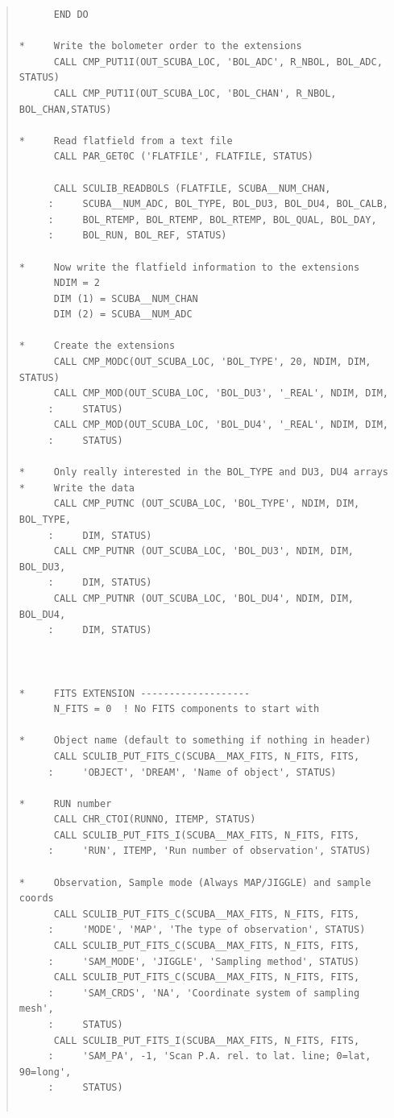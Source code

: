 \documentclass[twoside,11pt]{article}
\newenvironment{myquote}{\begin{quote}\begin{small}}{\end{small}\end{quote}}
\renewcommand{\_}{\texttt{\symbol{95}}}
\begin{document}
\begin{myquote}
\begin{verbatim}
      END DO

*     Write the bolometer order to the extensions
      CALL CMP_PUT1I(OUT_SCUBA_LOC, 'BOL_ADC', R_NBOL, BOL_ADC, STATUS)
      CALL CMP_PUT1I(OUT_SCUBA_LOC, 'BOL_CHAN', R_NBOL, BOL_CHAN,STATUS)

*     Read flatfield from a text file
      CALL PAR_GET0C ('FLATFILE', FLATFILE, STATUS)

      CALL SCULIB_READBOLS (FLATFILE, SCUBA__NUM_CHAN,
     :     SCUBA__NUM_ADC, BOL_TYPE, BOL_DU3, BOL_DU4, BOL_CALB,
     :     BOL_RTEMP, BOL_RTEMP, BOL_RTEMP, BOL_QUAL, BOL_DAY,
     :     BOL_RUN, BOL_REF, STATUS)

*     Now write the flatfield information to the extensions
      NDIM = 2
      DIM (1) = SCUBA__NUM_CHAN
      DIM (2) = SCUBA__NUM_ADC

*     Create the extensions
      CALL CMP_MODC(OUT_SCUBA_LOC, 'BOL_TYPE', 20, NDIM, DIM, STATUS)
      CALL CMP_MOD(OUT_SCUBA_LOC, 'BOL_DU3', '_REAL', NDIM, DIM,
     :     STATUS)
      CALL CMP_MOD(OUT_SCUBA_LOC, 'BOL_DU4', '_REAL', NDIM, DIM,
     :     STATUS)

*     Only really interested in the BOL_TYPE and DU3, DU4 arrays
*     Write the data
      CALL CMP_PUTNC (OUT_SCUBA_LOC, 'BOL_TYPE', NDIM, DIM, BOL_TYPE,
     :     DIM, STATUS)
      CALL CMP_PUTNR (OUT_SCUBA_LOC, 'BOL_DU3', NDIM, DIM, BOL_DU3,
     :     DIM, STATUS)
      CALL CMP_PUTNR (OUT_SCUBA_LOC, 'BOL_DU4', NDIM, DIM, BOL_DU4,
     :     DIM, STATUS)



*     FITS EXTENSION -------------------
      N_FITS = 0  ! No FITS components to start with

*     Object name (default to something if nothing in header)
      CALL SCULIB_PUT_FITS_C(SCUBA__MAX_FITS, N_FITS, FITS,
     :     'OBJECT', 'DREAM', 'Name of object', STATUS)

*     RUN number
      CALL CHR_CTOI(RUNNO, ITEMP, STATUS)
      CALL SCULIB_PUT_FITS_I(SCUBA__MAX_FITS, N_FITS, FITS,
     :     'RUN', ITEMP, 'Run number of observation', STATUS)

*     Observation, Sample mode (Always MAP/JIGGLE) and sample coords
      CALL SCULIB_PUT_FITS_C(SCUBA__MAX_FITS, N_FITS, FITS,
     :     'MODE', 'MAP', 'The type of observation', STATUS)
      CALL SCULIB_PUT_FITS_C(SCUBA__MAX_FITS, N_FITS, FITS,
     :     'SAM_MODE', 'JIGGLE', 'Sampling method', STATUS)
      CALL SCULIB_PUT_FITS_C(SCUBA__MAX_FITS, N_FITS, FITS,
     :     'SAM_CRDS', 'NA', 'Coordinate system of sampling mesh', 
     :     STATUS)
      CALL SCULIB_PUT_FITS_I(SCUBA__MAX_FITS, N_FITS, FITS,
     :     'SAM_PA', -1, 'Scan P.A. rel. to lat. line; 0=lat, 90=long', 
     :     STATUS)


\end{verbatim}
\end{myquote}
\end{document}
